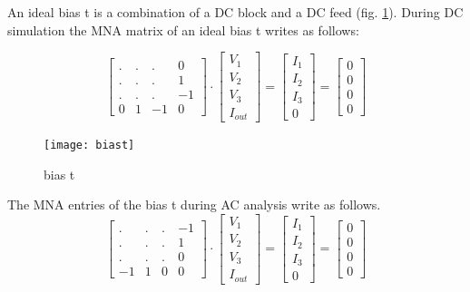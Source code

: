 An ideal bias t is a combination of a DC block and a DC feed
(fig. \ref{fig:biast}). During DC simulation the MNA matrix
of an ideal bias t writes as follows:

\begin{equation}
\begin{bmatrix}
 . & . & .  &  0\\
 . & . & .  &  1\\
 . & . & .  & -1\\
 0 & 1 & -1 &  0
\end{bmatrix}
\cdot
\begin{bmatrix}
V_{1}\\
V_{2}\\
V_{3}\\
I_{out}
\end{bmatrix}
=
\begin{bmatrix}
I_{1}\\
I_{2}\\
I_{3}\\
0
\end{bmatrix}
=
\begin{bmatrix}
0\\
0\\
0\\
0
\end{bmatrix}
\end{equation}

\begin{figure}[ht]
\begin{center}
\texttt{[image: biast]}
\end{center}
\caption{bias t}
\label{fig:biast}
\end{figure}
\FloatBarrier

The MNA entries of the bias t during AC analysis write as
follows.
\begin{equation}
\begin{bmatrix}
 . & . & .  & -1\\
 . & . & .  &  1\\
 . & . & .  &  0\\
-1 & 1 & 0  &  0
\end{bmatrix}
\cdot
\begin{bmatrix}
V_{1}\\
V_{2}\\
V_{3}\\
I_{out}
\end{bmatrix}
=
\begin{bmatrix}
I_{1}\\
I_{2}\\
I_{3}\\
0
\end{bmatrix}
=
\begin{bmatrix}
0\\
0\\
0\\
0
\end{bmatrix}
\end{equation}

